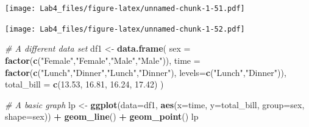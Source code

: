 \documentclass[]{article}
\newenvironment{Shaded}{\begin{snugshade}}{\end{snugshade}}
\newcommand{\KeywordTok}[1]{\textcolor[rgb]{0.13,0.29,0.53}{\textbf{#1}}}
\newcommand{\DataTypeTok}[1]{\textcolor[rgb]{0.13,0.29,0.53}{#1}}
\newcommand{\FloatTok}[1]{\textcolor[rgb]{0.00,0.00,0.81}{#1}}
\newcommand{\CharTok}[1]{\textcolor[rgb]{0.31,0.60,0.02}{#1}}
\newcommand{\StringTok}[1]{\textcolor[rgb]{0.31,0.60,0.02}{#1}}
\newcommand{\CommentTok}[1]{\textcolor[rgb]{0.56,0.35,0.01}{\textit{#1}}}
\newcommand{\OperatorTok}[1]{\textcolor[rgb]{0.81,0.36,0.00}{\textbf{#1}}}
\newcommand{\NormalTok}[1]{#1}
\begin{document}
\texttt{[image: Lab4\_files/figure-latex/unnamed-chunk-1-51.pdf]}

\begin{Shaded}
\end{Shaded}

\texttt{[image: Lab4\_files/figure-latex/unnamed-chunk-1-52.pdf]}

\begin{Shaded}
\begin{Highlighting}[]
\CommentTok{# A different data set}
\NormalTok{df1 <-}\StringTok{ }\KeywordTok{data.frame}\NormalTok{(}
    \DataTypeTok{sex =} \KeywordTok{factor}\NormalTok{(}\KeywordTok{c}\NormalTok{(}\StringTok{"Female"}\NormalTok{,}\StringTok{"Female"}\NormalTok{,}\StringTok{"Male"}\NormalTok{,}\StringTok{"Male"}\NormalTok{)),}
    \DataTypeTok{time =} \KeywordTok{factor}\NormalTok{(}\KeywordTok{c}\NormalTok{(}\StringTok{"Lunch"}\NormalTok{,}\StringTok{"Dinner"}\NormalTok{,}\StringTok{"Lunch"}\NormalTok{,}\StringTok{"Dinner"}\NormalTok{), }\DataTypeTok{levels=}\KeywordTok{c}\NormalTok{(}\StringTok{"Lunch"}\NormalTok{,}\StringTok{"Dinner"}\NormalTok{)),}
    \DataTypeTok{total_bill =} \KeywordTok{c}\NormalTok{(}\FloatTok{13.53}\NormalTok{, }\FloatTok{16.81}\NormalTok{, }\FloatTok{16.24}\NormalTok{, }\FloatTok{17.42}\NormalTok{)}
\NormalTok{)}

\CommentTok{# A basic graph}
\NormalTok{lp <-}\StringTok{ }\KeywordTok{ggplot}\NormalTok{(}\DataTypeTok{data=}\NormalTok{df1, }\KeywordTok{aes}\NormalTok{(}\DataTypeTok{x=}\NormalTok{time, }\DataTypeTok{y=}\NormalTok{total_bill, }\DataTypeTok{group=}\NormalTok{sex, }\DataTypeTok{shape=}\NormalTok{sex)) }\OperatorTok{+}\StringTok{ }\KeywordTok{geom_line}\NormalTok{() }\OperatorTok{+}\StringTok{ }\KeywordTok{geom_point}\NormalTok{()}
\NormalTok{lp}
\end{Highlighting}
\end{Shaded}
\end{document}
